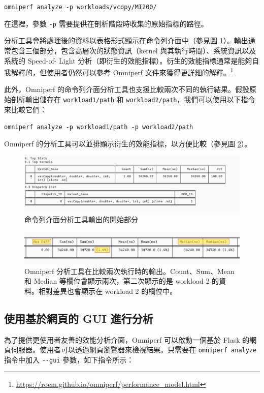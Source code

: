 \lstinline|omniperf analyze -p workloads/vcopy/MI200/|

在這裡，參數 \lstinline|-p| 需要提供在剖析階段時收集的原始指標的路徑。

分析工具會將處理後的資料以表格形式顯示在命令列介面中（參見圖 \ref{fig:omniperf-cli}）。輸出通常包含三個部分，包含高層次的狀態資訊（kernel 與其執行時間）、系統資訊以及系統的 Speed-of-
Light 分析（即衍生的效能指標）。衍生的效能指標通常是能夠自我解釋的，但使用者仍然可以參考 Omniperf 文件來獲得更詳細的解釋。\footnote{\url{https://rocm.github.io/omniperf/performance_model.html}}

此外，Omniperf 的命令列介面分析工具也支援比較兩次不同的執行結果。假設原始剖析輸出儲存在 \lstinline|workload1/path| 和 \lstinline|workload2/path|，我們可以使用以下指令來比較它們：

\lstinline|omniperf analyze -p workload1/path -p workload2/path|

Omniperf 的分析工具可以並排顯示衍生的效能指標，以方便比較（參見圖 \ref{fig:omniperf-compare}）。

\begin{figure}
    \centering
    \includegraphics[width=1\linewidth]{Appendici/OmniperfCLI.png}
    \caption{命令列介面分析工具輸出的開始部分}
    \label{fig:omniperf-cli}
\end{figure}

\begin{figure}
    \centering
    \includegraphics[width=1\linewidth]{Appendici/OmniperfCompare.png}
    \caption{Omniperf 分析工具在比較兩次執行時的輸出。Count、Sum、Mean 和 Median 等欄位會顯示兩次，第二次顯示的是 workload 2 的資料。相對差異也會顯示在 workload 2 的欄位中。}
    \label{fig:omniperf-compare}
\end{figure}


\subsection{使用基於網頁的 GUI 進行分析}
為了提供更使用者友善的效能分析介面，Omniperf 可以啟動一個基於 Flask \cite{grinberg2018flask} 的網頁伺服器。使用者可以透過網頁瀏覽器來檢視結果。只需要在 \lstinline|omniperf analyze| 指令中加入 \lstinline|--gui| 參數，如下指令所示：

